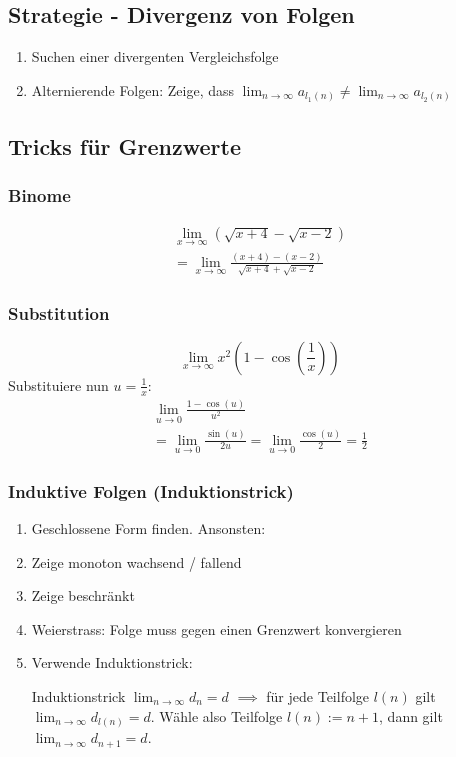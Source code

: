 \documentclass[a4paper,10pt]{article}
\def\limn{\lim_{n\to \infty}}
\begin{document}
\subsection{Strategie - Divergenz von Folgen}
\begin{enumerate}
 \item Suchen einer divergenten Vergleichsfolge
 \item Alternierende Folgen: Zeige, dass $\limn a_{l_1(n)} \ne \limn a_{l_2(n)}$
\end{enumerate}

\subsection{Tricks für Grenzwerte}
\subsubsection{Binome}
\begin{multline*}
    \lim_{x\to\infty} (\sqrt{x + 4} - \sqrt{x - 2}) \\
    = \lim_{x\to\infty} \frac{(x+4)-(x-2)}{\sqrt{x+4}+\sqrt{x-2}}
\end{multline*}

\subsubsection{Substitution}
$$\lim_{x\to\infty} x^2 (1-\cos(\frac{1}{x}))$$
Substituiere nun $u = \frac{1}{x}$:
\begin{multline*}
    \lim_{u \to 0} \frac{1 - \cos(u)}{u^2} \\
    = \lim_{u \to 0} \frac{\sin(u)}{2u} = \lim_{u\to 0} \frac{\cos(u)}{2} = \frac{1}{2}
\end{multline*}

\subsubsection{Induktive Folgen (Induktionstrick)}
\begin{enumerate}
  \item Geschlossene Form finden. Ansonsten:
  \item Zeige monoton wachsend / fallend
  \item Zeige beschränkt
  \item Weierstrass: Folge muss gegen einen Grenzwert konvergieren
  \item Verwende Induktionstrick:
  \begin{subbox}{Induktionstrick}
    $\limn{d_n} = d$ $\implies$ für jede Teilfolge $l(n)$ gilt $\limn{d_{l(n)}} = d$. Wähle also Teilfolge $l(n) := n + 1$, dann gilt $\limn{d_{n+1}} = d$.
  \end{subbox}
\end{enumerate}
\end{document}
